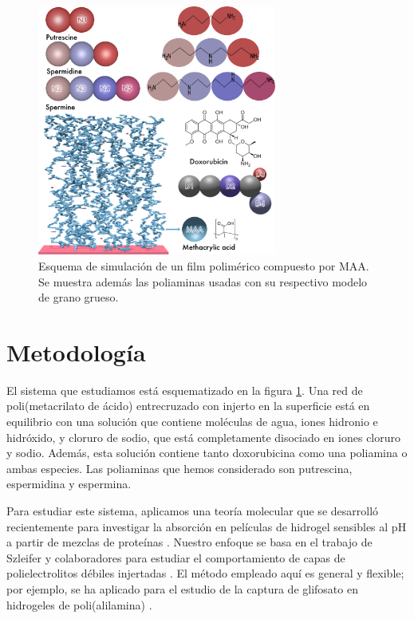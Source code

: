 \begin{figure}[!htb]
	\centering
	\includegraphics[width=0.7\textwidth]{Figures/graph-film/poliamines_model.png}
	\caption{Esquema de simulaci\'on de un film polim\'erico compuesto por MAA. Se muestra adem\'as las poliaminas usadas  con su respectivo  modelo de grano grueso.}
	\label{fig:film:model_poliamines}
\end{figure}





\section{Metodolog\'ia}


El sistema que estudiamos est\'a esquematizado en la figura \ref{fig:film:model_poliamines}.
Una red de poli(metacrilato de \'acido) entrecruzado con injerto en la superficie est\'a en equilibrio con una soluci\'on que contiene mol\'eculas de agua, iones hidronio e hidr\'oxido, y cloruro de sodio, que est\'a completamente disociado en iones cloruro y sodio.
Adem\'as, esta soluci\'on contiene tanto doxorubicina como una poliamina o ambas especies.
Las poliaminas que hemos considerado son putrescina, espermidina y espermina.

Para estudiar este sistema, aplicamos una teor\'ia molecular que se desarroll\'o recientemente para investigar la absorci\'on en películas de hidrogel sensibles al pH a partir de mezclas de prote\'inas .
Nuestro enfoque se basa en el trabajo de Szleifer y colaboradores para estudiar el comportamiento de capas de polielectrolitos d\'ebiles injertadas .
El m\'etodo empleado aqu\'i es general y flexible; por ejemplo, se ha aplicado para el estudio de la captura de glifosato en hidrogeles de poli(alilamina) \addcite[PerezChavez2018].


